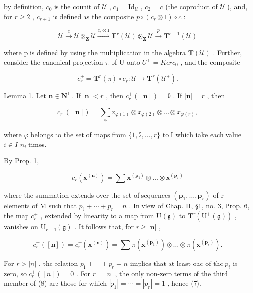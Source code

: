 by definition, \(c_0\) is the counit of \(\mathcal{U}\) , \(c_1 = \mathrm{Id}_{\mathcal{U}}\) , \(c_2 = c\) (the coproduct of \(\mathcal{U}\) ), and, for \(r \geq 2\) , \(c_{r+1}\) is defined as the composite \(p \circ (c_r \otimes 1) \circ c\) :

\[
\mathcal {U} \stackrel {{c}} {{\longrightarrow}} \mathcal {U} \otimes_ {\mathbf {Z}} \mathcal {U} \stackrel {{c _ {r} \otimes 1}} {{\longrightarrow}} \mathbf {T} ^ {r} (\mathcal {U}) \otimes_ {\mathbf {Z}} \mathcal {U} \stackrel {{p}} {{\longrightarrow}} \mathbf {T} ^ {r + 1} (\mathcal {U})
\]

where p is defined by using the multiplication in the algebra \(\mathbf{T}(\mathcal{U})\) . Further, consider the canonical projection \(\pi\) of U onto \(U^{+} = Ker c_{0}\) , and the composite

\[
c _ {r} ^ {+} = \mathbf {T} ^ {r} (\pi) \circ c _ {r}: \mathcal {U} \to \mathbf {T} ^ {r} (\mathcal {U} ^ {+}).
\]

Lemma 1. Let \(\mathbf{n} \in \mathbf{N}^{\mathrm{I}}\) . If \(|\mathbf{n}| < r\) , then \(c_{r}^{+}([ \mathbf{n}]) = 0\) . If \(|\mathbf{n}| = r\) , then

\[
c _ {r} ^ {+} ([ \mathbf {n} ]) = \sum_ {\varphi} x _ {\varphi (1)} \otimes x _ {\varphi (2)} \otimes \dots \otimes x _ {\varphi (r)},\tag{7}
\]

where \(\varphi\) belongs to the set of maps from \(\{1,2,\ldots,r\}\) to I which take each value \(i\in I\) \(n_{i}\) times.

By Prop. 1,

\[
c _ {r} \left(\mathbf {x} ^ {(\mathbf {n})}\right) = \sum \mathbf {x} ^ {\left(\mathbf {p} _ {1}\right)} \otimes \dots \otimes \mathbf {x} ^ {\left(\mathbf {p} _ {r}\right)}
\]

where the summation extends over the set of sequences \((\mathbf{p}_{1},\ldots,\mathbf{p}_{r})\) of r elements of M such that \(p_{1}+\cdots+p_{r}=n\) . In view of Chap. II, §1, no. 3, Prop. 6, the map \(c_{r}^{+}\) , extended by linearity to a map from \(\mathrm{U}(\mathfrak{g})\) to \(\mathbf{T}^{r}(\mathrm{U}^{+}(\mathfrak{g}))\) , vanishes on \(\mathrm{U}_{r-1}(\mathfrak{g})\) . It follows that, for \(r\geq|\mathbf{n}|\) ,

\[
c _ {r} ^ {+} ([ \mathbf {n} ]) = c _ {r} ^ {+} (\mathbf {x} ^ {(\mathbf {n})}) = \sum \pi (\mathbf {x} ^ {(\mathbf {p} _ {1})}) \otimes \dots \otimes \pi (\mathbf {x} ^ {(\mathbf {p} _ {r})}).\tag{8}
\]

For \(r > |n|\) , the relation \(p_{1} + \cdots + p_{r} = n\) implies that at least one of the \(p_{i}\) is zero, so \(c_{r}^{+}([n]) = 0\) . For \(r = |n|\) , the only non-zero terms of the third member of (8) are those for which \(|p_{1}| = \cdots = |p_{r}| = 1\) , hence (7).

